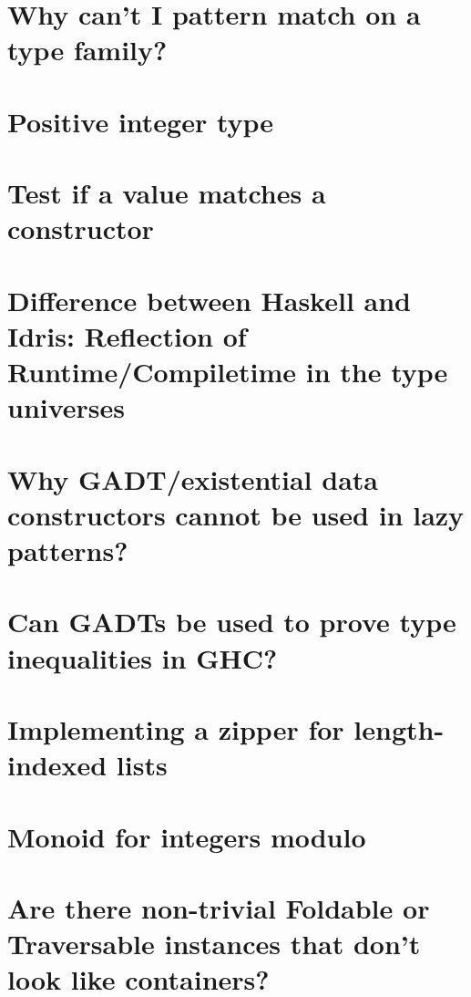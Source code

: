 \documentclass{book}%
\begin{document}
\section{Why can't I pattern match on a type family?}


\section{Positive integer type}


\section{Test if a value matches a constructor}


\section{Difference between Haskell and Idris: Reflection of Runtime/Compiletime in the type universes}


\section{Why GADT/existential data constructors cannot be used in lazy patterns?}


\section{Can GADTs be used to prove type inequalities in GHC?}


\section{Implementing a zipper for length-indexed lists}


\section{Monoid for integers modulo}


\section{Are there non-trivial Foldable or Traversable instances that don't look like containers?}

\end{document}
